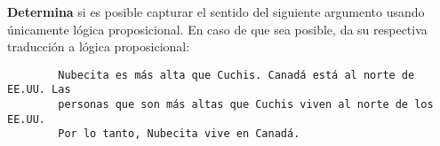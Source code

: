 \documentclass[oneside]{style}
\begin{document}
\begin{questions}[label=\protect\circled{\bfseries\arabic*}]
    \question
    {
        \textbf{Determina} si es posible capturar el sentido del siguiente 
        argumento usando únicamente lógica proposicional. En caso de que sea 
        posible, da su respectiva traducción a lógica proposicional:
        \begin{verbatim}
        Nubecita es más alta que Cuchis. Canadá está al norte de EE.UU. Las 
        personas que son más altas que Cuchis viven al norte de los EE.UU. 
        Por lo tanto, Nubecita vive en Canadá. 
        \end{verbatim}
    }

\end{questions}
\end{document}
